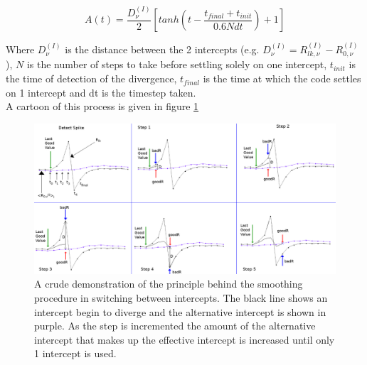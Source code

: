 \begin{equation}
	A(t) = \frac{D_{\nu}^{(I)}}{2} \left[ tanh\left( t - \frac{t_{final} + t_{init}}{0.6 N dt} \right) + 1 \right]
	\label{eq:tanhSmoothParam}
\end{equation}

Where $D_{\nu}^{(I)}$ is the distance between the 2 intercepts (e.g. $D_{\nu}^{(I)} = R_{lk, \nu}^{(I)} - R_{0, \nu}^{(I)}$), $N$ is the number of steps to take before settling solely on one intercept, $t_{init}$ is the time of detection of the divergence, $t_{final}$ is the time at which the code settles on 1 intercept and dt is the timestep taken.
\\
A cartoon of this process is given in figure \ref{fig:tanh_explan}
\begin{figure}[ht]
	\includegraphics[width=\textwidth]{./img/CTMQC/tanh_explanation.png}
	\caption{\label{fig:tanh_explan}A crude demonstration of the principle behind the smoothing procedure in switching between intercepts. The black line shows an intercept begin to diverge and the alternative intercept is shown in purple. As the step is incremented the amount of the alternative intercept that makes up the effective intercept is increased until only 1 intercept is used.}
\end{figure}


